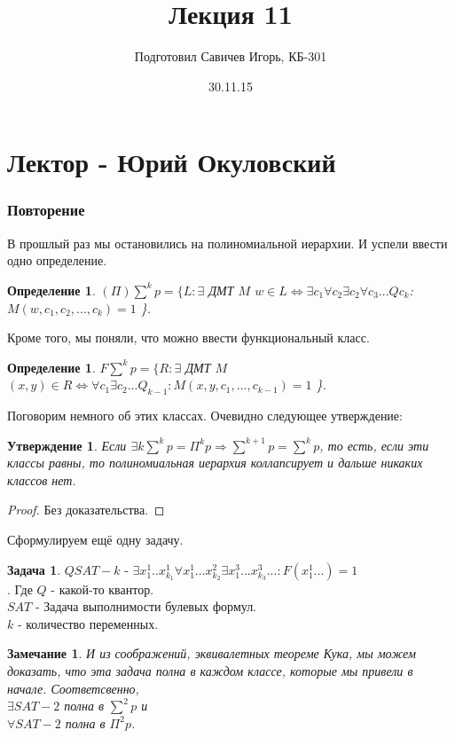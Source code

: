 \documentclass{beamer}
\title{Лекция 11}
\author{Подготовил Савичев Игорь, КБ-301}
\theoremstyle{plain}
\newtheorem{state}[thm]{Утверждение}
\newtheorem{rmk}[thm]{Замечание}
\newtheorem{dfn}[thm]{Определение}
\theoremstyle{definition}
\newtheorem{prob-rus}[thm]{Задача}
\begin{document}
\date{30.11.15}



\section{Лектор - Юрий Окуловский}
\begin{frame}
    \frametitle{Повторение}
    В прошлый раз мы остановились на полиномиальной иерархии.
    И успели ввести одно определение.
    \begin{dfn}
        $(\Pi)\sum^kp = \{L: \exists$ ДМТ $M$ $w \in L
        \Leftrightarrow \exists c_1 \forall c_2 \exists c_2
        \forall c_3 ... Qc_k$: $M(w, c_1, c_2, ..., c_k) = 1$ \}.
    \end{dfn}
    Кроме того, мы поняли, что можно ввести функциональный класс.
    \begin{dfn}
        $F\sum^kp = \{R: \exists$ ДМТ $M$ $(x,y)\in R
        \Leftrightarrow \forall c_1 \exists c_2 ... Q_{k-1}:
         M(x, y, c_1, ..., c_{k-1}) = 1$ \}.
    \end{dfn}
\end{frame}

\begin{frame}
    Поговорим немного об этих классах.
    Очевидно следующее утверждение:
    \begin{state}
        Если $\exists k \sum^kp = \Pi^kp \Rightarrow \sum^{k+1}p = \sum^kp$, то есть, если эти классы равны, то полиномиальная иерархия коллапсирует
        и дальше никаких классов нет.
    \end{state}
    \begin{proof}
        Без доказательства.
    \end{proof}
\end{frame}

\begin{frame}
    Сформулируем ещё одну задачу.
    \begin{prob-rus}
        $QSAT-k$ - $\exists x_1^1 .. x_{k_1}^1 \forall x_1^1 ... x_{k_2}^2 \exists x_1^3 ... x_{k_3}^3 ... : F(x_1^1...) = 1$ \\.
        Где $Q$ - какой-то квантор. \\
        $SAT$ - Задача выполнимости булевых формул.\\
        $k$ - количество переменных.
    \end{prob-rus}
    \begin{rmk}
        И из соображений, эквивалетных теореме Кука, мы можем доказать, что эта
        задача полна в каждом классе, которые мы привели в начале.
        Соответсвенно, \\
        $\exists SAT-2$ полна в $\sum^2p$ и \\
        $\forall SAT-2$ полна в $\Pi^2p$.
    \end{rmk}
\end{frame}
\end{document}

